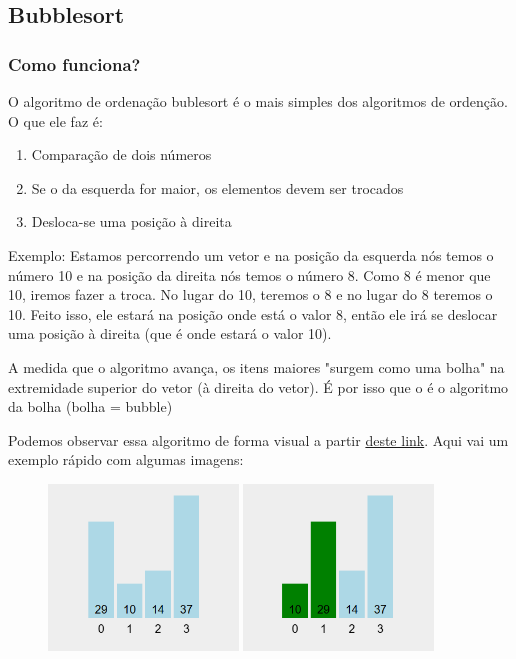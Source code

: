 \documentclass{report}
\begin{document}
	\subsection{Bubblesort}
	
	\subsubsection{Como funciona?}
	O algoritmo de ordenação bublesort  é o mais simples dos algoritmos de ordenção. O que ele faz é:
	
	\begin{enumerate}
		\item Comparação de dois números
		\item Se o da esquerda for maior, os elementos devem ser trocados
		\item Desloca-se uma posição à direita
	\end{enumerate}
	
	
	Exemplo: Estamos percorrendo um vetor e na posição da esquerda nós temos o número 10 e na posição da direita nós temos o número 8. Como 8 é menor que 10, iremos fazer a troca. No lugar do 10, teremos o 8 e no lugar do 8 teremos o 10. Feito isso, ele estará na posição onde está o valor 8, então ele irá se deslocar uma posição à direita (que é onde estará o valor 10).
	
	A medida que o algoritmo avança, os itens maiores "surgem como uma bolha" na extremidade superior do vetor (à direita do vetor). É por isso que o é o  algoritmo da bolha (bolha = bubble)
	
	Podemos observar essa algoritmo de forma visual a partir \href{ https://visualgo.net/en/sorting}{deste link}. Aqui vai um exemplo rápido com algumas imagens:


	\begin{figure}[h]
		\centering
		\includegraphics[width=0.45\textwidth]{imagens/bubble-sort1.png}
		\hfill
		\includegraphics[width=0.45\textwidth]{imagens/bubble-sort2.png}

	\end{figure}
	
\end{document}
